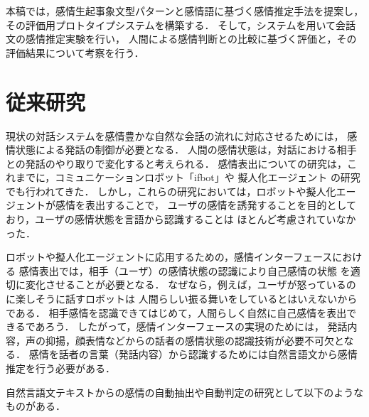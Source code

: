 \documentclass[japanese]{jnlp_1.3c}
\begin{document}
本稿では，感情生起事象文型パターンと感情語に基づく感情推定手法を提案し，
その評価用プロトタイプシステムを構築する．
そして，システムを用いて会話文の感情推定実験を行い，
人間による感情判断との比較に基づく評価と，その評価結果について考察を行う．


\section{従来研究}

現状の対話システムを感情豊かな自然な会話の流れに対応させるためには，
感情状態による発話の制御が必要となる．
人間の感情状態は，対話における相手との発話のやり取りで変化すると考えられる．
感情表出についての研究は，これまでに，コミュニケーションロボット「ifbot」\cite{ifbot}や
擬人化エージェント \cite{Mori}の研究でも行われてきた．
しかし，これらの研究においては，ロボットや擬人化エージェントが感情を表出することで，
ユーザの感情を誘発することを目的としており，ユーザの感情状態を言語から認識することは
ほとんど考慮されていなかった．

ロボットや擬人化エージェントに応用するための，感情インターフェースにおける
感情表出では，相手（ユーザ）の感情状態の認識により自己感情の状態
を適切に変化させることが必要となる．
なぜなら，例えば，ユーザが怒っているのに楽しそうに話すロボットは
人間らしい振る舞いをしているとはいえないからである．
相手感情を認識できてはじめて，人間らしく自然に自己感情を表出できるであろう．
したがって，感情インターフェースの実現のためには，
発話内容，声の抑揚，顔表情などからの話者の感情状態の認識技術が必要不可欠となる．
感情を話者の言葉（発話内容）から認識するためには自然言語文から感情推定を行う必要がある．

自然言語文テキストからの感情の自動抽出や自動判定の研究として以下のようなものがある．
\end{document}
